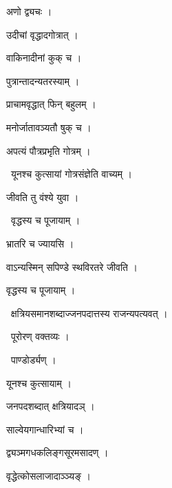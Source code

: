 \documentclass[10pt, openany, oneside]{book}
\begin{document}
\noindent अणो द्व्यचः ।

\noindent उदीचां वृद्धादगोत्रात् ।

\noindent वाकिनादीनां कुक् च ।

\noindent पुत्रान्तादन्यतरस्याम् ।

\noindent प्राचामवृद्धात् फिन् बहुलम् ।

\noindent मनोर्जातावञ्यतौ षुक् च ।

\noindent अपत्यं पौत्रप्रभृति गोत्रम् ।

\par\noindent\hspace{1.5em}{\vps वा॰}~{\qt यूनश्च कुत्सायां गोत्रसंज्ञेति वाच्यम् ।}

\noindent जीवति तु वंश्ये युवा ।

\par\noindent\hspace{1.5em}{\vps वा॰}~{\qt वृद्धस्य च पूजायाम् ।}

\noindent भ्रातरि च ज्यायसि ।

\noindent वाऽन्यस्मिन् सपिण्डे स्थविरतरे जीवति ।

\noindent वृद्धस्य च पूजायाम् ।

\par\noindent\hspace{1.5em}{\vps वा॰}~{\qt क्षत्रियसमानशब्दाज्जनपदात्तस्य राजन्यपत्यवत् ।}

\par\noindent\hspace{1.5em}{\vps वा॰}~{\qt पूरोरण् वक्तव्यः ।}

\par\noindent\hspace{1.5em}{\vps वा॰}~{\qt पाण्डोर्ड्यण् ।}

\noindent यूनश्च कुत्सायाम् ।

\noindent जनपदशब्दात् क्षत्रियादञ् ।

\noindent साल्वेयगान्धारिभ्यां च ।

\noindent द्व्यञ्मगधकलिङ्गसूरमसादण् ।

\noindent वृद्धेत्कोसलाजादाञ्ञ्यङ् ।
\end{document}
